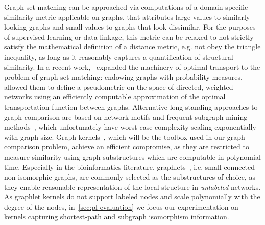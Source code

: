 Graph set matching can be approached via computations of a domain specific similarity metric applicable on graphs, that attributes large values to similarly looking graphs and small values to graphs that look dissimilar. For the purposes of supervised learning or data linkage, this metric can be relaxed to not strictly satisfy the mathematical definition of a distance metric, e.g. not obey the triangle inequality, as long as it reasonably captures a quantification of structural similarity. In a recent work,~ expanded the machinery of optimal transport to the problem of graph set matching: endowing graphs with probability measures, allowed them to define a pseudometric on the space of directed, weighted networks using an efficiently computable approximation of the optimal transportation function between graphs. Alternative long-standing approaches to graph comparison are based on network motifs and frequent subgraph mining methods~\citep{milo02,Yan2002}, which unfortunately have worst-case complexity scaling exponentially with graph size. Graph kernels~\citep{Vishwanathan2010}, which will be the toolbox used in our graph comparison problem, achieve an efficient compromise, as they are restricted to measure similarity using graph substructures which are computable in polynomial time. Especially in the bioinformatics literature, graphlets~\citep{przulj07,shervashidze09}, i.e. small connected non-isomorphic graphs, are commonly selected as the substructures of choice, as they enable reasonable representation of the local structure in \emph{unlabeled} networks. As graphlet kernels do not support labeled nodes and scale polynomially with the degree of the nodes, in~\cref{sec:pl-evaluation} we focus our experimentation on kernels capturing shortest-path and subgraph isomorphism information.
